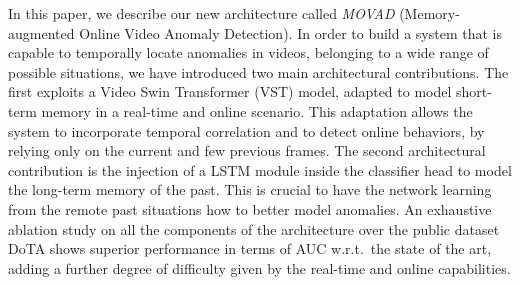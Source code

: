 In this paper, we describe our new architecture called \emph{MOVAD} (Memory-augmented Online Video Anomaly Detection).
In order to build a system that is capable to temporally locate anomalies in videos, belonging to a wide range of possible situations, we have introduced two main architectural contributions.
The first exploits a Video Swin Transformer \cite{liu_video_2022} (VST) model, adapted to model short-term memory in a real-time and online scenario.
This adaptation allows the system to incorporate temporal correlation and to detect online behaviors, by relying only on the current and few previous frames.
The second architectural contribution is the injection of a LSTM module inside the classifier head to model the long-term memory of the past.
This is crucial to have the network learning from the remote past situations how to better model anomalies.
An exhaustive ablation study on all the components of the architecture over the public dataset DoTA \cite{9712446} shows superior performance in terms of AUC w.r.t.~the state of the art, adding a further degree of difficulty given by the real-time and online capabilities.